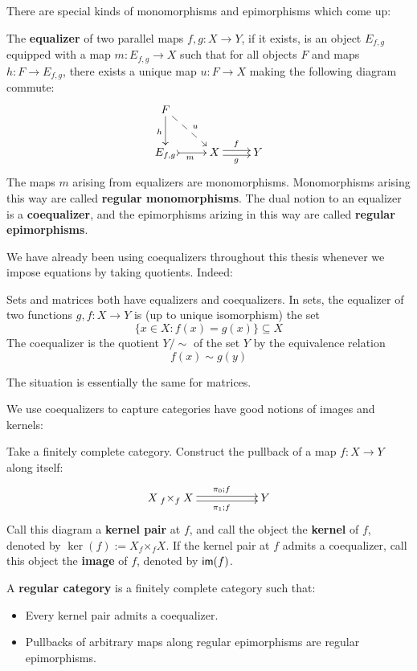 There are  special kinds of monomorphisms and epimorphisms which come up:
\begin{definition}
The {\bf equalizer} of two parallel maps $f,g:X\to Y$, if it exists, is an object $E_{f,g}$ equipped with a map $m:E_{f,g}\to X$ such that for all objects $F$ and maps $h:F\to E_{f,g}$, there exists a unique map $u:F\to X$ making the following diagram commute:
$$
\xymatrix{
    F \ar@{-->}[dr]^{u} \ar[d]_h
  \\ E_{f,g} \ar@{>->}[r]_m
    & X \ar@<-.5ex>[r]_g \ar@<.5ex>[r]^f
    & Y
}
$$
The maps $m$ arising from equalizers are monomorphisms.  Monomorphisms arising this way are called {\bf regular monomorphisms}.
The dual notion to an equalizer is a {\bf coequalizer}, and the epimorphisms arizing in this way are called {\bf regular epimorphisms}.
\end{definition}
We have already been using coequalizers throughout this thesis whenever we impose equations by taking quotients.  Indeed:
\begin{example}
Sets and matrices both have equalizers and coequalizers.
In sets, the equalizer of two functions $g,f:X\to Y$ is (up to unique isomorphism) the set 
$$\{x \in X:f(x)=g(x)\} \subseteq X$$
The coequalizer is the quotient $Y/\sim$   of the set $Y$ by the equivalence relation 
$$f(x)\sim g(y)$$

The situation is essentially the same for matrices.
\end{example}
We  use coequalizers to capture categories have good notions of images and kernels:
\begin{definition}
Take a finitely complete category.  Construct the pullback of a map $f:X\to Y$ along itself:
 $$\xymatrix{X\mathbin{{}_f \mathord{\times}_{f}}X  \ar@<-.5ex>[rr]_{\ \ \pi_1;f}  \ar@<.5ex>[rr]^{\ \ \pi_0;f}&& Y}$$
Call this diagram a {\bf kernel pair} at $f$, and call the object  the {\bf kernel} of $f$, denoted by $\ker(f):=X\mathbin{{}_f \mathord{\times}_{f}}X$.
If the kernel pair at $f$ admits a coequalizer, call this object the {\bf image} of $f$, denoted by $\mathsf{im}(f)$.

A {\bf regular category} is a finitely complete category such that:
\begin{itemize}
\item Every kernel pair admits a coequalizer.
\item Pullbacks of arbitrary maps along regular epimorphisms are regular epimorphisms.
\end{itemize}
\end{definition}
